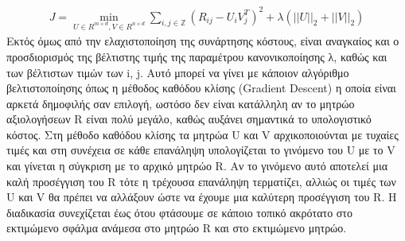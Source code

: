\begin{itemize}
\begin{align} 
J = \mathop{\min}_{U \in R^{m \times d},V \in R^{n \times d}}{\sum_{i,j\in\mathbb{Z}}\left(R_{ij}-U_iV_j^T\right)^2} + \lambda(||U||_{2} + ||V||_{2}) \label{eq:2}
\end{align} 
Εκτός όμως από την ελαχιστοποίηση της συνάρτησης κόστους, είναι αναγκαίος και ο προσδιορισμός της βέλτιστης τιμής της παραμέτρου κανονικοποίησης λ, καθώς και των βέλτιστων τιμών των i, j. Αυτό μπορεί να γίνει με κάποιον αλγόριθμο βελτιστοποίησης όπως η μέθοδος καθόδου κλίσης (Gradient Descent) η οποία είναι αρκετά δημοφιλής σαν επιλογή, ωστόσο δεν είναι κατάλληλη αν το μητρώο αξιολογήσεων R είναι πολύ μεγάλο, καθώς αυξάνει σημαντικά το υπολογιστικό κόστος. Στη μέθοδο καθόδου κλίσης τα μητρώα U και V  αρχικοποιούνται με τυχαίες τιμές και στη συνέχεια σε κάθε επανάληψη υπολογίζεται το γινόμενο του U με το V και γίνεται η σύγκριση με το αρχικό μητρώο R. Αν το γινόμενο αυτό αποτελεί μια καλή προσέγγιση του R τότε η τρέχουσα επανάληψη τερματίζει, αλλιώς οι τιμές των U και V θα πρέπει να αλλάξουν ώστε να έχουμε μια καλύτερη προσέγγιση του R. Η διαδικασία συνεχίζεται έως ότου φτάσουμε σε κάποιο τοπικό ακρότατο στο εκτιμώμενο σφάλμα ανάμεσα στο μητρώο R και στο εκτιμώμενο μητρώο.\end{itemize}

